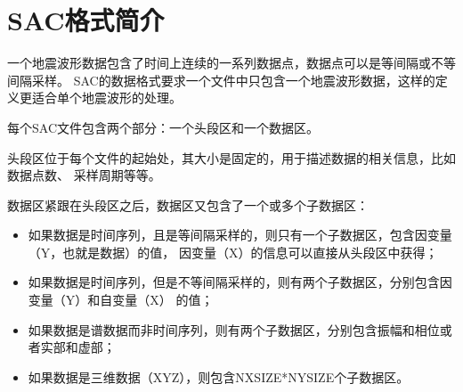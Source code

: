 \section{SAC格式简介}
一个地震波形数据包含了时间上连续的一系列数据点，数据点可以是等间隔或不等间隔采样。
SAC的数据格式要求一个文件中只包含一个地震波形数据，这样的定义更适合单个地震波形的处理。

每个SAC文件包含两个部分：一个头段区和一个数据区。

头段区位于每个文件的起始处，其大小是固定的，用于描述数据的相关信息，比如数据点数、
采样周期等等。

数据区紧跟在头段区之后，数据区又包含了一个或多个子数据区：
\begin{itemize}
\item 如果数据是时间序列，且是等间隔采样的，则只有一个子数据区，包含因变量（Y，也就是数据）的值，
    因变量（X）的信息可以直接从头段区中获得；
\item 如果数据是时间序列，但是不等间隔采样的，则有两个子数据区，分别包含因变量（Y）和自变量（X）
    的值；
\item 如果数据是谱数据而非时间序列，则有两个子数据区，分别包含振幅和相位或者实部和虚部；
\item 如果数据是三维数据（XYZ），则包含NXSIZE*NYSIZE个子数据区。
\end{itemize}
